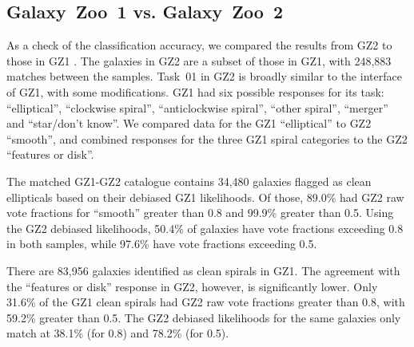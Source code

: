 \documentclass[useAMS,usenatbib]{mn2e}
\begin{document}
\subsection{Galaxy~Zoo~1 vs. Galaxy~Zoo~2}

As a check of the classification accuracy, we compared the results from GZ2 to those in GZ1 \citep{lin11}. The galaxies in GZ2 are a subset of those in GZ1, with 248,883 matches between the samples. Task~01 in GZ2 is broadly similar to the interface of GZ1, with some modifications. GZ1 had six possible responses for its task: ``elliptical'', ``clockwise spiral'', ``anticlockwise spiral'', ``other spiral'', ``merger'' and ``star/don't know''. We compared data for the GZ1 ``elliptical'' to GZ2 ``smooth'', and combined responses for the three GZ1 spiral categories to the GZ2 ``features or disk''. 

The matched GZ1-GZ2 catalogue contains 34,480 galaxies flagged as clean ellipticals based on their debiased GZ1 likelihoods. Of those, 89.0\% had GZ2 raw vote fractions for ``smooth'' greater than 0.8 and 99.9\% greater than 0.5. Using the GZ2 debiased likelihoods, 50.4\% of galaxies have vote fractions exceeding 0.8 in both samples, while 97.6\% have vote fractions exceeding 0.5. 

There are 83,956 galaxies identified as clean spirals in GZ1. The agreement with the ``features or disk'' response in GZ2, however, is significantly lower. Only 31.6\% of the GZ1 clean spirals had GZ2 raw vote fractions greater than 0.8, with 59.2\% greater than 0.5. The GZ2 debiased likelihoods for the same galaxies only match at 38.1\% (for 0.8) and 78.2\% (for 0.5). 
\end{document}
